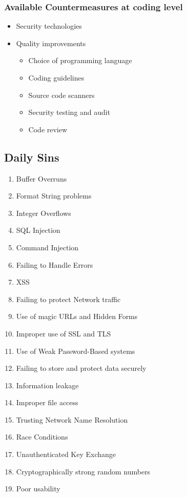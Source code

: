 \subsubsection{Available Countermeasures at coding level}
\begin{itemize}
    \item Security technologies
    \item Quality improvements
    \begin{itemize}
        \item Choice of programming language
        \item Coding guidelines
        \item Source code scanners
        \item Security testing and audit
        \item Code review
    \end{itemize}
\end{itemize}

\subsection{Daily Sins}
\begin{enumerate}
    \item Buffer Overruns
    \item Format String problems
    \item Integer Overflows
    \item SQL Injection
    \item Command Injection
    \item Failing to Handle Errors
    \item XSS
    \item Failing to protect Network traffic
    \item Use of magic URLs and Hidden Forms
    \item Improper use of SSL and TLS
    \item Use of Weak Password-Based systems
    \item Failing to store and protect data securely
    \item Information leakage
    \item Improper file access
    \item Trusting Network Name Resolution
    \item Race Conditions
    \item Unauthenticated Key Exchange
    \item Cryptographically strong random numbers
    \item Poor usability
\end{enumerate}